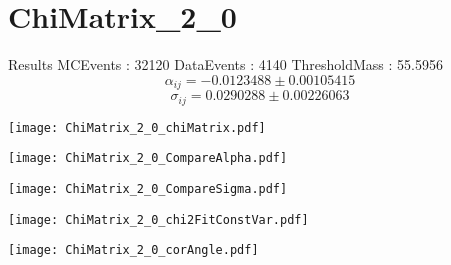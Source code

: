 \documentclass[a4paper,12pt]{article}
\begin{document}
\section{ChiMatrix\_2\_0}
\begin{minipage}{0.49\linewidth} Results \newline
MCEvents : 32120\newline
DataEvents : 4140 \newline
ThresholdMass : 55.5956\\
$$\alpha_{ij} = -0.0123488\pm 0.00105415$$
$$\sigma_{ij} = 0.0290288\pm 0.00226063$$
\end{minipage}\hfill
\begin{minipage}{0.49\linewidth} 
\texttt{[image: ChiMatrix\_2\_0\_chiMatrix.pdf]}\\
\end{minipage}
\hfill
\begin{minipage}{0.49\linewidth} 
\texttt{[image: ChiMatrix\_2\_0\_CompareAlpha.pdf]}\\
\end{minipage}
\hfill
\begin{minipage}{0.49\linewidth} 
\texttt{[image: ChiMatrix\_2\_0\_CompareSigma.pdf]}\\
\end{minipage}
\begin{minipage}{0.49\linewidth} 
\texttt{[image: ChiMatrix\_2\_0\_chi2FitConstVar.pdf]}\\
\end{minipage}
\hfill
\begin{minipage}{0.49\linewidth} 
\texttt{[image: ChiMatrix\_2\_0\_corAngle.pdf]}\\
\end{minipage}
\end{document}
